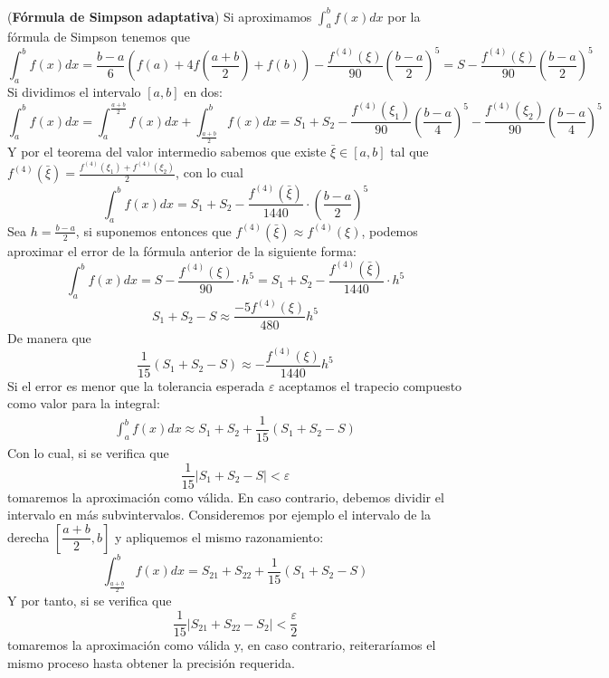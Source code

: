  \newpage
 \begin{ejem}
     (\textbf{Fórmula de Simpson adaptativa})
     Si aproximamos $\int_a^bf(x)dx$ por la fórmula de Simpson tenemos que
   $$\int_a^{b}f(x)dx= \dfrac{b-a}{6}(f(a)+4f\left(\dfrac{a+b}{2}\right)+f(b))-\dfrac{f^{(4)}(\xi)}{90}\left(\dfrac{b-a}{2}\right)^5=S-\dfrac{f^{(4)}(\xi)}{90}\left(\dfrac{b-a}{2}\right)^5$$
    Si dividimos el intervalo $[a,b]$ en dos:
    $$\int_a^bf(x)dx=\int_a^{\frac{a+b}{2}}f(x)dx+\int_{\frac{a+b}{2}}^bf(x)dx=S_1+S_2-\dfrac{f^{(4)}(\xi_1)}{90}\left(\dfrac{b-a}{4}\right)^5-\dfrac{f^{(4)}(\xi_2)}{90}\left(\dfrac{b-a}{4}\right)^5$$
    Y por el teorema del valor intermedio sabemos que existe $\bar{\xi}\in[a,b]$ tal que $f^{(4)}(\bar{\xi})=\frac{f^{(4)}(\xi_1)+f^{(4)}(\xi_2)}{2}$, con lo cual
    $$\int_a^bf(x)dx=S_1+S_2-\dfrac{f^{(4)}(\bar{\xi})}{1440}\cdot \left(\dfrac{b-a}{2}\right)^5$$
    Sea $h=\frac{b-a}{2}$, si suponemos entonces que $f^{(4)}(\bar{\xi})\approx f^{(4)}(\xi)$, podemos aproximar el error de la fórmula anterior de la siguiente forma:
    $$\int_a^bf(x)dx=S-\dfrac{f^{(4)}(\xi)}{90}\cdot h^5= S_1+S_2-\dfrac{f^{(4)}(\bar{\xi})}{1440}\cdot h^5$$
    $$S_1+S_2-S\approx\dfrac{-5f^{(4)}(\xi)}{480}h^5$$
    De manera que
    $$\dfrac{1}{15}(S_1+S_2-S)\approx -\dfrac{f^{(4)}(\xi)}{1440}h^5$$
    Si el error es menor que la tolerancia esperada $\varepsilon$ aceptamos el trapecio compuesto como valor para la integral:
    \begin{align}
    \int_a^bf(x)dx\approx S_1+S_2+\dfrac{1}{15}(S_1+S_2-S)
    \label{simp:adap}
    \end{align}
    Con lo cual, si se verifica que
    $$\dfrac{1}{15}|S_1+S_2-S|<\varepsilon$$
    tomaremos la aproximación como válida. En caso contrario, debemos dividir el intervalo en más subvintervalos. Consideremos por ejemplo el intervalo de la derecha $\left[\dfrac{a+b}{2},b\right]$ y apliquemos el mismo razonamiento:
    $$\int_{\frac{a+b}{2}}^bf(x)dx=S_{21}+S_{22}+\dfrac{1}{15}(S_1+S_2-S)$$
    Y por tanto, si se verifica que
    $$\dfrac{1}{15}|S_{21}+S_{22}-S_2|<\dfrac{\varepsilon}{2}$$
    tomaremos la aproximación como válida y, en caso contrario, reiteraríamos el mismo proceso hasta obtener la precisión requerida. 
 \end{ejem}
